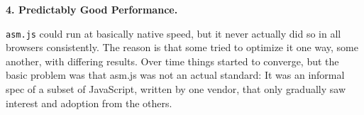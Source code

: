 \textbf{4. Predictably Good Performance.}

\texttt{asm.js} could run at basically native speed, but it never actually did so in all browsers consistently. The reason is that some tried to optimize it one way, some another, with differing results. Over time things started to converge, but the basic problem was that asm.js was not an actual standard: It was an informal spec of a subset of JavaScript, written by one vendor, that only gradually saw interest and adoption from the others.  